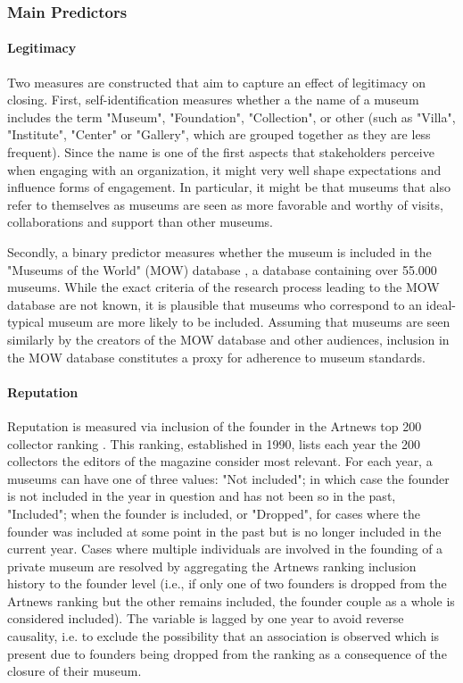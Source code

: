 \documentclass[12pt]{article}
\begin{document}
\subsubsection*{Main Predictors}
\label{sec:orge0e80eb}


\paragraph*{Legitimacy}
\label{sec:org9952eec}

Two measures are constructed that aim to capture an effect of legitimacy on closing.
First, self-identification measures whether a the name of a museum includes the term "Museum", "Foundation", "Collection", or other (such as "Villa", "Institute", "Center" or "Gallery", which are grouped together as they are less frequent).
Since the name is one of the first aspects that stakeholders perceive when engaging with an organization, it might very well shape expectations and influence forms of engagement.
In particular, it might be that museums that also refer to themselves as museums are seen as more favorable and worthy of visits, collaborations and support than other museums.


Secondly, a binary predictor measures whether the museum is included in the "Museums of the World" (MOW) database \parencite{deGruyter_2021_MOW}, a database containing over 55.000 museums.
While the exact criteria of the research process leading to the MOW database are not known, it is plausible that museums who correspond to an ideal-typical museum are more likely to be included.
Assuming that museums are seen similarly by the creators of the MOW database and other audiences, inclusion in the MOW database constitutes a proxy for adherence to museum standards. 


\paragraph*{Reputation}
\label{sec:org051c5db}

Reputation is measured via inclusion of the founder in the Artnews top 200 collector ranking \parencite{Artnews_ranking}.
This ranking, established in 1990, lists each year the 200 collectors the editors of the magazine consider most relevant.
For each year, a museums can have one of three values: "Not included"; in which case the founder is not included in the year in question and has not been so in the past, "Included"; when the founder is included, or "Dropped", for cases where the founder was included at some point in the past but is no longer included in the current year.
Cases where multiple individuals are involved in the founding of a private museum are resolved by aggregating the Artnews ranking inclusion history to the founder level (i.e., if only one of two founders is dropped from the Artnews ranking but the other remains included, the founder couple as a whole is considered included).
The variable is lagged by one year to avoid reverse causality, i.e. to exclude the possibility that an association is observed which is present due to founders being dropped from the ranking as a consequence of the closure of their museum.
\end{document}
